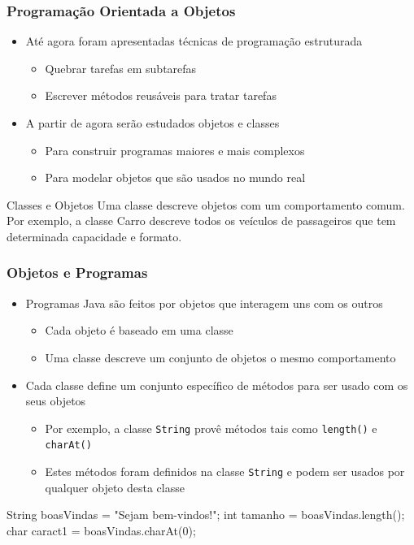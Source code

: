 \documentclass[xcolor={dvipsnames,table},aspectratio=169]{beamer}
\begin{document}
\begin{frame}\frametitle{Programação Orientada a Objetos}
\begin{itemize}
	\item Até agora foram apresentadas técnicas de programação estruturada
	\begin{itemize}
		\item Quebrar tarefas em subtarefas
		\item Escrever métodos reusáveis para tratar tarefas
	\end{itemize}
	\item A partir de agora serão estudados objetos e classes
	\begin{itemize}
		\item Para construir programas maiores e mais complexos
		\item Para modelar objetos que são usados no mundo real
	\end{itemize}
\end{itemize}
\begin{block}{Classes e Objetos}
Uma classe descreve objetos com um comportamento comum.
Por exemplo, a classe Carro descreve todos os veículos de passageiros que tem determinada capacidade e formato.
\end{block}
\end{frame}

\begin{frame}[fragile]\frametitle{Objetos e Programas}
\begin{itemize}
	\item Programas Java são feitos por objetos que interagem uns com os outros
	\begin{itemize}
		\item Cada objeto é baseado em uma classe
		\item Uma classe descreve um conjunto de objetos o mesmo comportamento 
	\end{itemize}
	\item Cada classe define um conjunto específico de métodos para ser usado com os seus objetos
	\begin{itemize}
		\item Por exemplo, a classe \texttt{String} provê métodos tais como \texttt{length()} e \texttt{charAt()}
		\item Estes métodos foram definidos na classe \texttt{String} e podem ser usados por qualquer objeto desta classe
	\end{itemize}
\end{itemize}
\begin{javacode}
String boasVindas = "Sejam bem-vindos!";
int  tamanho = boasVindas.length();
char caract1 = boasVindas.charAt(0);
\end{javacode}
\end{frame}
\end{document}
